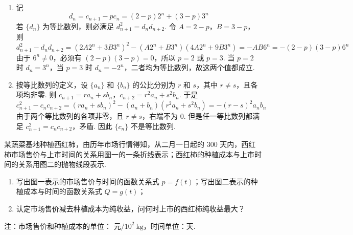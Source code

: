 \begin{solution}
\begin{enumerate}
\item 记
\[
d_n=c_{n+1}-pc_n=(2-p)2^n+(3-p)3^n
\]
若 \(\{d_n\}\) 为等比数列，则必满足 \(d_{n+1}^2=d_nd_{n+2}\). 令 \(A=2-p\)，\(B=3-p\)，则
\[
d_{n+1}^2-d_nd_{n+2}
=(2A2^n+3B3^n)^2-(A2^n+B3^n)(4A2^n+9B3^n)
=-AB6^n=-(2-p)(3-p)6^n
\]
由于 \(6^n\ne0\)，必须有 \((2-p)(3-p)=0\)，所以 \(p=2\) 或 \(p=3\). 当 \(p=2\) 时 \(d_n=3^n\)，当 \(p=3\) 时 \(d_n=-2^n\)，二者均为等比数列，故这两个值都成立.
\item 按等比数列的定义，设 \(\{a_n\}\) 和 \(\{b_n\}\) 的公比分别为 \(r\) 和 \(s\)，其中 \(r\ne s\)，且各项均非零. 则
\(c_{n+1}=ra_n+sb_n\)，\(c_{n+2}=r^2a_n+s^2b_n\).
于是
\[
c_{n+1}^2-c_nc_{n+2}
=(ra_n+sb_n)^2-(a_n+b_n)(r^2a_n+s^2b_n)
=-(r-s)^2a_nb_n
\]
由于两个等比数列的各项非零，且 \(r\ne s\)，右端不为 \(0\). 但是任一等比数列都满足 \(c_{n+1}^2=c_nc_{n+2}\)，矛盾. 因此 \(\{c_n\}\) 不是等比数列.
\end{enumerate}
\end{solution}

\begin{problem}
某蔬菜基地种植西红柿，由历年市场行情得知，从二月一日起的 \(300\) 天内，西红柿市场售价与上市时间的关系用图一的一条折线表示；西红柿的种植成本与上市时间的关系用图二的抛物线段表示.

\begin{enumerate}
\item 写出图一表示的市场售价与时间的函数关系式 \(p=f(t)\)；写出图二表示的种植成本与时间的函数关系式 \(Q=g(t)\)；
\item 认定市场售价减去种植成本为纯收益，问何时上市的西红柿纯收益最大？
\end{enumerate}

注：市场售价和种植成本的单位：\(\text{ 元}/10^{2}\mathrm{~kg}\)，时间单位：\(\text{天}\).

\end{problem}

